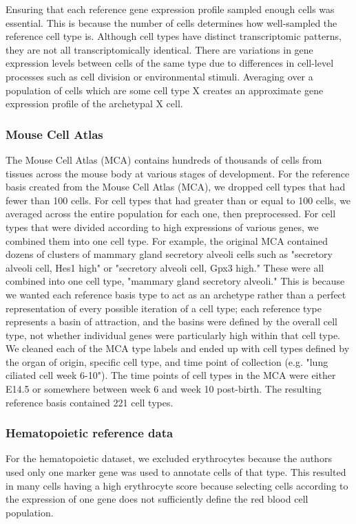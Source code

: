 \documentclass[aps,superscriptaddress, notitlepage,longbibliography]{revtex4-1}
\begin{document}
Ensuring that each reference gene expression profile sampled enough cells was essential. This is because the number of cells determines how well-sampled the reference cell type is. Although cell types have distinct transcriptomic patterns, they are not all transcriptomically identical. There are variations in gene expression levels between cells of the same type due to differences in cell-level processes such as cell division or environmental stimuli. Averaging over a population of cells which are some cell type X creates an approximate gene expression profile of the archetypal X cell. 

\subsubsection{Mouse Cell Atlas}
The Mouse Cell Atlas (MCA) contains hundreds of thousands of cells from tissues across the mouse body at various stages of development. For the reference basis created from the Mouse Cell Atlas (MCA), we dropped cell types that had fewer than 100 cells. For cell types that had greater than or equal to 100 cells, we averaged across the entire population for each one, then preprocessed. For cell types that were divided according to high expressions of various genes, we combined them into one cell type. For example, the original MCA contained dozens of clusters of mammary gland secretory alveoli cells such as "secretory alveoli cell, Hes1 high" or "secretory alveoli cell, Gpx3 high." These were all combined into one cell type, "mammary gland secretory alveoli." This is because we wanted each reference basis type to act as an archetype rather than a perfect representation of every possible iteration of a cell type; each reference type represents a basin of attraction, and the basins were defined by the overall cell type, not whether individual genes were particularly high within that cell type. We cleaned each of the MCA type labels and ended up with cell types defined by the organ of origin, specific cell type, and time point of collection (e.g. "lung ciliated cell week 6-10"). The time points of cell types in the MCA were either E14.5 or somewhere between week 6 and week 10 post-birth.   The resulting reference basis contained 221 cell types.

\subsubsection{Hematopoietic reference data}
For the hematopoietic dataset, we excluded erythrocytes because the authors used only one marker gene was used to annotate cells of that type. This resulted in many cells having a high erythrocyte score because selecting cells according to the expression of one gene does not sufficiently define the red blood cell population.
\end{document}
